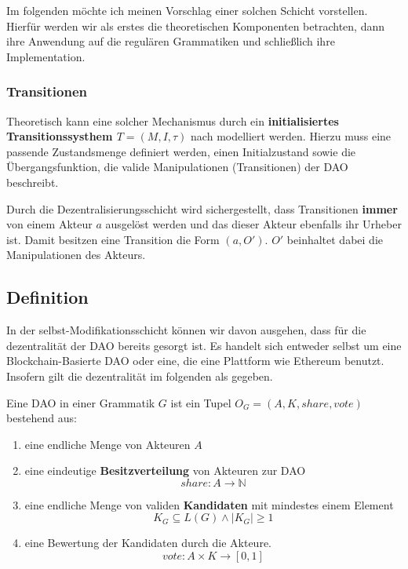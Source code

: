 \documentclass[a4paper,12pt]{article}
\begin{document}
Im folgenden möchte ich meinen Vorschlag einer solchen Schicht vorstellen. Hierfür werden wir als erstes die theoretischen Komponenten betrachten, dann ihre Anwendung auf die regulären Grammatiken und schließlich ihre Implementation.

\subsubsection*{Transitionen}
Theoretisch kann eine solcher Mechanismus durch ein \textbf{initialisiertes Transitionssysthem $T=(M,I,\tau)$} nach \cite{Glausch} modelliert werden. Hierzu muss eine passende Zustandsmenge definiert werden, einen Initialzustand sowie die Übergangsfunktion, die valide Manipulationen (Transitionen) der DAO beschreibt.

Durch die Dezentralisierungsschicht wird sichergestellt, dass Transitionen \textbf{immer} von einem Akteur $a$ ausgelöst werden und das dieser Akteur ebenfalls ihr Urheber ist. Damit besitzen eine Transition die Form $(a, O')$. $O'$ beinhaltet dabei die Manipulationen des Akteurs.


\subsection{Definition}
In der selbst-Modifikationsschicht können wir davon ausgehen, dass für die dezentralität der DAO bereits gesorgt ist. Es handelt sich entweder selbst um eine Blockchain-Basierte DAO oder eine, die eine Plattform wie Ethereum benutzt. Insofern gilt die dezentralität im folgenden als gegeben.

Eine DAO in einer Grammatik $G$ ist ein Tupel $O_G=(A, K, share, vote)$ bestehend aus:

\begin{enumerate}
\item eine endliche Menge von Akteuren $A$
\item eine eindeutige \textbf{Besitzverteilung} von Akteuren zur DAO
  \[share: A \rightarrow \mathbb{N}\]
\item eine endliche Menge von validen \textbf{Kandidaten} mit mindestes einem Element 
  \[K_G \subseteq L(G) \land |K_G| \geq 1\] 
\item eine Bewertung der Kandidaten durch die Akteure. 
  \[vote: A\times K \rightarrow [0,1]\]
\end{enumerate}

\end{document}
